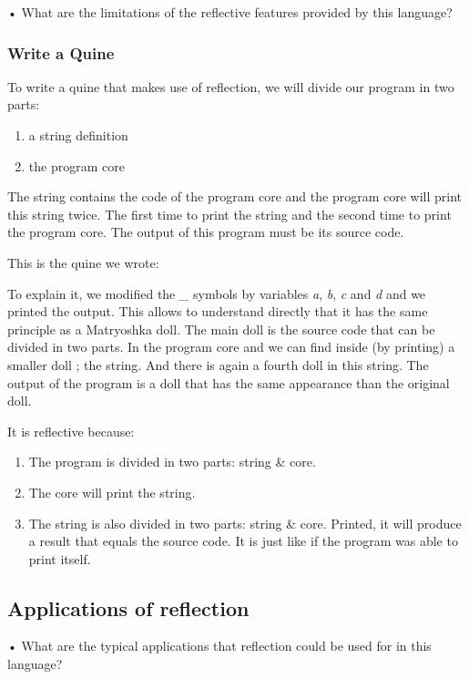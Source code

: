 •	What are the limitations of the reflective features provided by this language?\\


\subsubsection{Write a Quine}
To write a quine that makes use of reflection, we will divide our program in two parts:
\begin{enumerate}
    \item a string definition
    \item the program core
\end{enumerate}
The string contains the code of the program core and the program core will print this string twice. The first time to print the string and the second time to print the program core. The output of this program must be its source code.

This is the quine we wrote:


To explain it, we modified the \emph{\_} symbols by variables \emph{a}, \emph{b}, \emph{c} and \emph{d} and we printed the output. This allows to understand directly that it has the same principle as a Matryoshka doll. The main doll is the source code that can be divided in two parts. In the program core and we can find inside (by printing) a smaller doll ; the string. And there is again a fourth doll in this string. The output of the program is a doll that has the same appearance than the original doll.


It is reflective because:
\begin{enumerate}
    \item The program is divided in two parts: string \& core.
    \item The core will print the string.
    \item The string is also divided in two parts: string \& core. Printed, it will produce a result that equals the source code. It is just like if the program was able to print itself. 
\end{enumerate}

\subsection{Applications of reflection}
•	What are the typical applications that reflection could be used for in this language?\\

